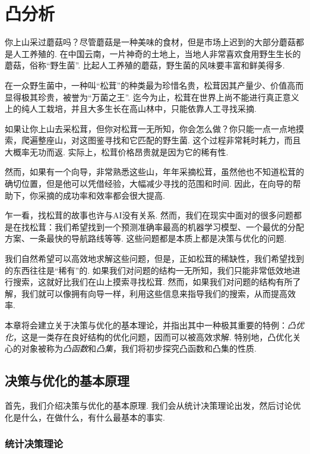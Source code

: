 \chapter{凸分析}\label{chap:convex-analysis}

你上山采过蘑菇吗？尽管蘑菇是一种美味的食材，但是市场上迟到的大部分蘑菇都是人工养殖的. 在中国云南，一片神奇的土地上，当地人非常喜欢食用野生生长的蘑菇，俗称“野生菌”. 比起人工养殖的蘑菇，野生菌的风味要丰富和鲜美得多. 

在一众野生菌中，一种叫“松茸”的种类最为珍惜名贵，松茸因其产量少、价值高而显得极其珍贵，被誉为“万菌之王”. 迄今为止，松茸在世界上尚不能进行真正意义上的纯人工栽培，并且大多生长在高山林中，只能依靠人工寻找采摘. 

如果让你上山去采松茸，但你对松茸一无所知，你会怎么做？你只能一点一点地摸索，爬遍整座山，对这图鉴寻找和它匹配的野生菌. 这个过程非常耗时耗力，而且大概率无功而返. 实际上，松茸价格昂贵就是因为它的稀有性. 

然而，如果有一个向导，非常熟悉这些山，年年采摘松茸，虽然他也不知道松茸的确切位置，但是他可以凭借经验，大幅减少寻找的范围和时间. 因此，在向导的帮助下，你采摘的成功率和效率都会很大提高. 

乍一看，找松茸的故事也许与AI没有关系. 然而，我们在现实中面对的很多问题都是在找松茸：我们希望找到一个预测准确率最高的机器学习模型、一个最优的分配方案、一条最快的导航路线等等. 这些问题都是本质上都是决策与优化的问题. 

我们自然希望可以高效地求解这些问题，但是，正如松茸的稀缺性，我们希望找到的东西往往是“稀有”的. 如果我们对问题的结构一无所知，我们只能非常低效地进行搜索，这就好比我们在山上摸索寻找松茸. 然而，如果我们对问题的结构有所了解，我们就可以像拥有向导一样，利用这些信息来指导我们的搜索，从而提高效率. 

本章将会建立关于决策与优化的基本理论，并指出其中一种极其重要的特例：\emph{凸优化}，这是一类存在良好结构的优化问题，因而可以被高效求解. 特别地，凸优化关心的对象被称为\emph{凸函数}和\emph{凸集}，我们将初步探究凸函数和凸集的性质. 

\section{决策与优化的基本原理}\label{sec:decision-optimization-principle}

首先，我们介绍决策与优化的基本原理. 我们会从统计决策理论出发，然后讨论优化是什么，在做什么，有什么最基本的事实. 

\subsection{统计决策理论}

